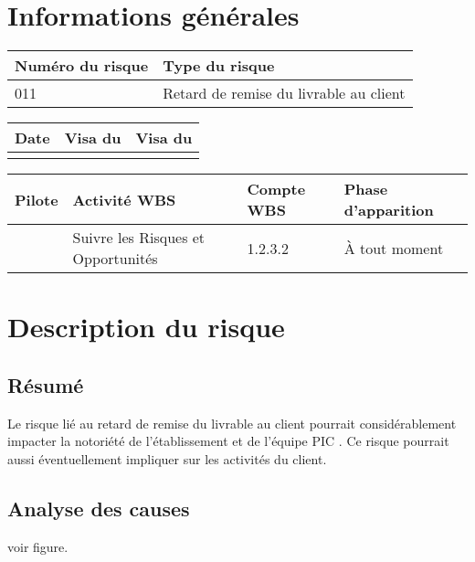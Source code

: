 \section*{Informations générales}
 
\begin{table}[H]
\centering
	\begin{tabularx}{16.8cm}{|X|X|}
	\hline
	\rowcolor{gray!40} Numéro du risque & Type du risque \\
	\hline
	011 & Retard de remise du livrable au client \\
	\hline
	\end{tabularx}
\end{table}

\begin{table}[H]
\centering
	\begin{tabularx}{16.8cm}{|X|X|X|}
	\hline
	\rowcolor{gray!40} Date & Visa du \RQ & Visa du \CP \\
	\hline
	  &  &  \\
	\hline
	\end{tabularx}
\end{table}

\begin{table}[H]
\centering
	\begin{tabularx}{16.8cm}{|X|X|X|X|}
	\hline
	\rowcolor{gray!40} Pilote & Activité WBS & Compte WBS & Phase d'apparition \\
	\hline
	 \Kafui & Suivre les Risques et Opportunités & 1.2.3.2 & À tout moment\\
	\hline
	\end{tabularx}
\end{table}

\section*{Description du risque}

\subsection*{Résumé}
	Le risque lié au retard de remise du livrable au client pourrait considérablement impacter la notoriété de l'établissement et de l'équipe PIC . Ce risque pourrait aussi éventuellement impliquer sur les activités du client.
	
\subsection*{Analyse des causes}
	voir figure.


